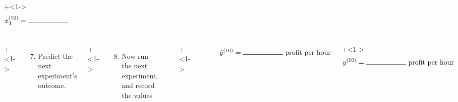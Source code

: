 \begin{frame}
\begin{columns}[T]
			\vspace{-1.3cm}
			\onslide+<1->{	
				\begin{align*} 
					x_\text{T}^{(10)} &= \rule{2cm}{.5pt}
				\end{align*}
			}
	\end{columns}
	
	\vspace{-0.3cm}
	\begin{columns}[T]

			\vspace{0cm}
			\onslide+<1->{
				{\tiny 
					\begin{enumerate}\setcounter{enumi}{6}
						\item	Predict the next experiment's outcome.
					\end{enumerate}
				
				\par}
			}
			
			\vspace{0cm}
			\onslide+<1->{
				{\tiny 
					\begin{enumerate}\setcounter{enumi}{7}
						\item	Now run the next experiment, and record the values
					\end{enumerate}
				
				\par}
			}
			
			\rule[3mm]{0.01cm}{85mm}%
			
			
			\onslide+<1->{	
				\hrule
				
				\begin{align*}
					~~~\hat{y}^{(10)}  = \rule{2cm}{.5pt} ~\text{profit per hour} 
				\end{align*}
			}
			
			\vspace{-1.15cm}
			\onslide+<1->{	
				\begin{align*}
					y^{(10)} &=  \rule{2cm}{.5pt} ~\text{profit per hour}
				\end{align*}
			}
	\end{columns}
	
\end{frame}

